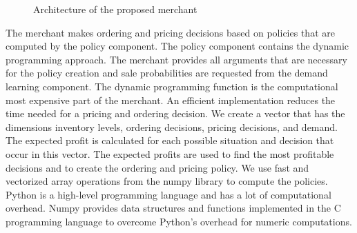 \begin{figure}[t]
\centering
{}
\caption{Architecture of the proposed merchant}
\label{fig:merchant_architecture}
\end{figure}
\egroup

The merchant makes ordering and pricing decisions based on policies that are computed by the policy component.
The policy component contains the dynamic programming approach.
The merchant provides all arguments that are necessary for the policy creation and sale probabilities are requested from the demand learning component.
The dynamic programming function is the computational most expensive part of the merchant.
An efficient implementation reduces the time needed for a pricing and ordering decision.
We create a vector that has the dimensions inventory levels, ordering decisions, pricing decisions, and demand.
The expected profit is calculated for each possible situation and decision that occur in this vector.
The expected profits are used to find the most profitable decisions and to create the ordering and pricing policy.
We use fast and vectorized array operations from the numpy library to compute the policies.
Python is a high-level programming language and has a lot of computational overhead.
Numpy provides data structures and functions implemented in the C programming language to overcome Python's overhead for numeric computations.

